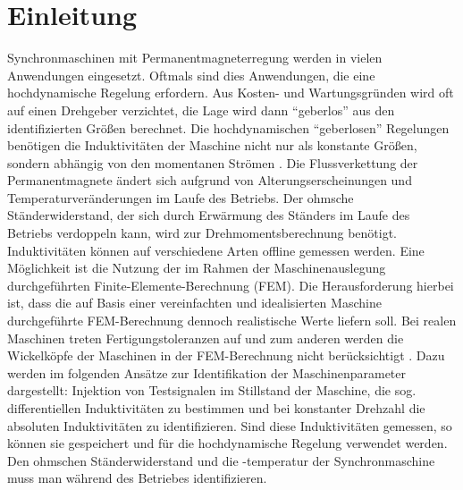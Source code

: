 \documentclass[conference,twocolumn]{IEEEtran}
\begin{document}
\section{Einleitung}
Synchronmaschinen mit Permanentmagneterregung werden in vielen Anwendungen eingesetzt.
Oftmals sind dies Anwendungen, die eine hochdynamische Regelung erfordern.
Aus Kosten- und Wartungsgründen wird oft auf einen Drehgeber verzichtet, die Lage wird dann \enquote{geberlos} aus den identifizierten Größen berechnet.
Die hochdynamischen \enquote{geberlosen} Regelungen benötigen die Induktivitäten der Maschine nicht nur als konstante Größen, sondern abhängig von den momentanen Strömen \autocite{Kellner2012}.
Die Flussverkettung der Permanentmagnete ändert sich aufgrund von Alterungserscheinungen und Temperaturveränderungen im Laufe des Betriebs.
Der ohmsche Ständerwiderstand, der sich durch Erwärmung des Ständers im Laufe des Betriebs verdoppeln kann, wird zur Drehmomentsberechnung benötigt.
Induktivitäten können auf verschiedene Arten offline gemessen werden.
Eine Möglichkeit ist die Nutzung der im Rahmen der Maschinenauslegung durchgeführten Finite-Elemente-Berechnung (FEM).
Die Herausforderung hierbei ist, dass die auf Basis einer vereinfachten und idealisierten Maschine durchgeführte FEM-Berechnung dennoch realistische Werte liefern soll.
Bei realen Maschinen treten Fertigungstoleranzen auf und zum anderen werden die Wickelköpfe der Maschinen in der FEM-Berechnung nicht berücksichtigt \autocite{ternes2012}.
Dazu werden im folgenden Ansätze zur Identifikation der Maschinenparameter dargestellt:
Injektion von Testsignalen im Stillstand der Maschine, die sog. differentiellen Induktivitäten zu bestimmen und bei konstanter Drehzahl die absoluten Induktivitäten zu identifizieren.
Sind diese Induktivitäten gemessen, so können sie gespeichert und für die hochdynamische Regelung verwendet werden.
Den ohmschen Ständerwiderstand und die -temperatur der Synchronmaschine muss man während des Betriebes identifizieren.
\end{document}
